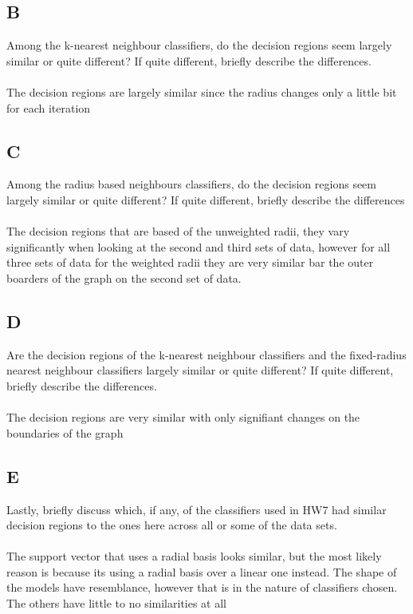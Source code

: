 \documentclass[12pt]{article}
\begin{document}
\subsection{B}
Among the k-nearest neighbour classifiers, do the decision regions seem largely similar or quite different? If quite different, briefly describe the differences.\\\\
The decision regions are largely similar since the radius changes only a little bit for each iteration

\subsection{C}
Among the radius based neighbours classifiers, do the decision regions seem largely similar or quite different? If quite different, briefly describe the differences\\\\
The decision regions that are based of the unweighted radii, they vary significantly when looking at the second and third sets of data, however for all three sets of data for the weighted radii they are very similar bar the outer boarders of the graph on the second set of data.

\subsection{D}
Are the decision regions of the k-nearest neighbour classifiers and the fixed-radius nearest neighbour classifiers largely similar or quite different? If quite different, briefly describe the differences.\\\\
The decision regions are very similar with only signifiant changes on the boundaries of the graph

\subsection{E}
Lastly, briefly discuss which, if any, of the classifiers used in HW7 had similar decision regions to the ones here across all or some of the data sets.\\\\
The support vector that uses a radial basis looks similar, but the most likely reason is because its using a radial basis over a linear one instead. The shape of the models have resemblance, however that is in the nature of classifiers chosen. The others have little to no similarities at all




\end{document}
